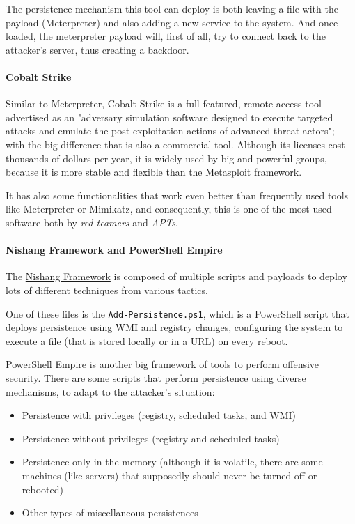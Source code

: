 
The persistence mechanism this tool can deploy is both leaving a file with the payload (Meterpreter) and also adding a new service to the system. And once loaded, the meterpreter payload will, first of all, try to connect back to the attacker's server, thus creating a backdoor.


\paragraph{Cobalt Strike}
Similar to Meterpreter, Cobalt Strike\cite{CobaltStrike} is a full-featured, remote access tool advertised as an "adversary simulation software designed to execute targeted attacks and emulate the post-exploitation actions of advanced threat actors"; with the big difference that is also a commercial tool. Although its licenses cost thousands of dollars per year, it is widely used by big and powerful groups, because it is more stable and flexible than the Metasploit framework. 

It has also some functionalities that work even better than frequently used tools like Meterpreter or Mimikatz\cite{Mimikatz}, and consequently, this is one of the most used software both by \textit{red teamers} and \textit{APTs}.

\paragraph{Nishang Framework and PowerShell Empire}
The \underline{Nishang Framework} is composed of multiple scripts and payloads to deploy lots of different techniques from various tactics.

One of these files is the \texttt{Add-Persistence.ps1}\cite{Nishang}, which is a PowerShell script that deploys persistence using WMI and registry changes, configuring the system to execute a file (that is stored locally or in a URL) on every reboot.

\pagebreak
\underline{PowerShell Empire} is another big framework of tools to perform offensive security\cite{Empire}. There are some scripts that perform persistence using diverse mechanisms, to adapt to the attacker's situation: 
\begin{itemize}
\item Persistence with privileges (registry, scheduled tasks, and WMI)
\item Persistence without privileges (registry and scheduled tasks)
\item Persistence only in the memory (although it is volatile, there are some machines (like servers) that supposedly should never be turned off or rebooted)
\item Other types of miscellaneous persistences

\end{itemize}

